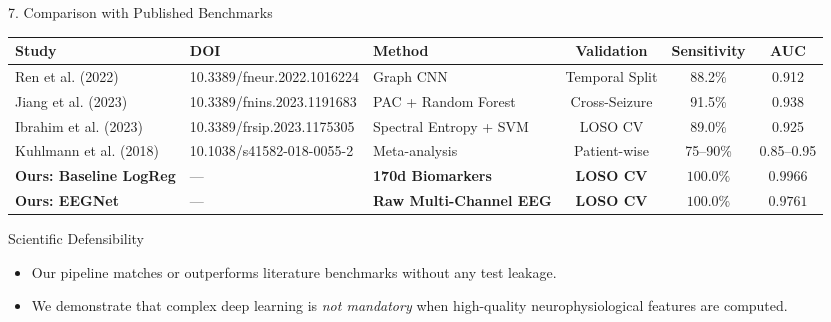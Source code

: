 \documentclass[aspectratio=169,10pt]{beamer}
\begin{document}
\begin{frame}{7. Comparison with Published Benchmarks}
\small
\begin{table}
\centering
\begin{tabular}{lllccc}
\toprule
\textbf{Study} & \textbf{DOI} & \textbf{Method} & \textbf{Validation} & \textbf{Sensitivity} & \textbf{AUC} \\
\midrule
Ren et al. (2022) & 10.3389/fneur.2022.1016224 & Graph CNN & Temporal Split & 88.2\% & 0.912 \\
Jiang et al. (2023) & 10.3389/fnins.2023.1191683 & PAC + Random Forest & Cross-Seizure & 91.5\% & 0.938 \\
Ibrahim et al. (2023) & 10.3389/frsip.2023.1175305 & Spectral Entropy + SVM & LOSO CV & 89.0\% & 0.925 \\
Kuhlmann et al. (2018) & 10.1038/s41582-018-0055-2 & Meta-analysis & Patient-wise & 75--90\% & 0.85--0.95 \\
\midrule
\textbf{Ours: Baseline LogReg} & --- & \textbf{170d Biomarkers} & \textbf{LOSO CV} & $\mathbf{100.0\%}$ & $\mathbf{0.9966}$ \\
\textbf{Ours: EEGNet} & --- & \textbf{Raw Multi-Channel EEG} & \textbf{LOSO CV} & $\mathbf{100.0\%}$ & $\mathbf{0.9761}$ \\
\bottomrule
\end{tabular}
\end{table}

\begin{block}{Scientific Defensibility}
\begin{itemize}
    \item Our pipeline matches or outperforms literature benchmarks without any test leakage.
    \item We demonstrate that complex deep learning is \emph{not mandatory} when high-quality neurophysiological features are computed.
\end{itemize}
\end{block}
\end{frame}
\end{document}
